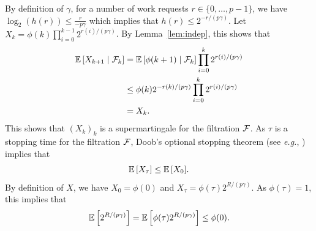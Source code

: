   By definition of $\gamma$, for a number of work requests
  $r\in\{0,\dots,p-1\}$, we have
  $\log_2(h(r)) \leq \frac{r}{ -p \gamma }$ which implies that
  $h(r)\le 2^{-r/(p\gamma)}$.
  Let $X_{k}=\phi(k)\prod_{i=0}^{k-1}2^{r(i)/(p\gamma)}$. By
  Lemma~\ref{lem:indep}, this shows that
  \begin{align*}
    \esp{X_{k+1}\mid\calF_k} &= \esp{\phi(k+1) \mid \calF_k}
                               \prod_{i=0}^{k}2^{r(i)/(p\gamma)}\\
                             &\le \phi(k) 2^{-r(k)/(p\gamma)}
                               \prod_{i=0}^{k}2^{r(i)/(p\gamma)}\\
                             &=X_k.
  \end{align*}
  This shows that $(X_k)_k$ is a supermartingale for the filtration
  $\mathcal{F}$. As $\tau$ is a stopping time for the filtration $\mathcal{F}$,
  Doob's optional stopping theorem (see \emph{e.g.},
  \cite[Theorem~4.1]{durrett1996probability}) implies that
  \begin{equation}
    \esp{X_\tau} \le \esp{X_0}. 
    \label{eq:doob}
  \end{equation}
  By definition of $X$, we have $X_0=\phi(0)$ and
  $X_\tau=\phi(\tau)2^{R/(p\gamma)}$. As $\phi(\tau)=1$, this implies
  that
  \begin{align}
    \esp{2^{R/(p\gamma)}}=
    \esp{\phi(\tau)2^{R/(p\gamma)}} \le \phi(0).
    \label{eq:doob2}
  \end{align}
